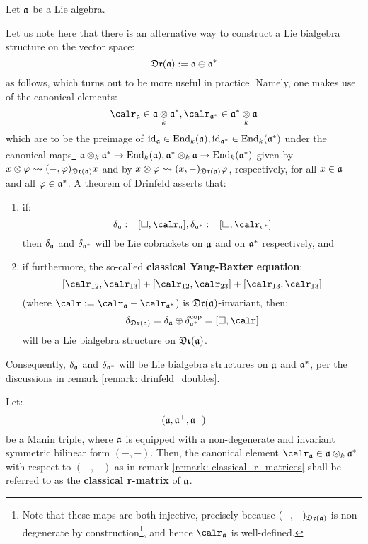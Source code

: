         \begin{remark} \label{remark: classical_r_matrices}
            Let $\a$ be a Lie algebra.
        
            Let us note here that there is an alternative way to construct a Lie bialgebra structure on the vector space:
                $$\mathfrak{Dr}(\mathfrak{a}) := \mathfrak{a} \oplus \mathfrak{a}^*$$
            as follows, which turns out to be more useful in practice. Namely, one makes use of the canonical elements:
                $$\calr_{\a} \in \a \tensor_k \a^*, \calr_{\a^*} \in \a^* \tensor_k \a$$
            which are to be the preimage of $\mathrm{id}_{\mathfrak{a}} \in \mathrm{End}_k(\mathfrak{a}), \mathrm{id}_{\mathfrak{a}^*} \in \mathrm{End}_k(\mathfrak{a}^*)$ under the canonical maps\footnote{Note that these maps are both injective, precisely because $(-, -)_{\mathfrak{Dr}(\mathfrak{a})}$ is non-degenerate by construction\footnote{Note that we are not making use of invariance here, and hence we do not need to assume that $\a$ is a Lie bialgebra from the start (this assumption is needed for the construction of the Lie bracket on $\frakDr(\a)$).}, and hence $\calr_{\a}$ is well-defined.} $\a \tensor_k \a^* \to \End_k(\a), \a^* \tensor_k \a \to \End_k(\a^*)$ given by $x \tensor \varphi \mapsto (-, \varphi)_{\frakDr(\a)} x$ and by $x \tensor \varphi \mapsto (x, -)_{\frakDr(\a)} \varphi$, respectively, for all $x \in \mathfrak{a}$ and all $\varphi \in \mathfrak{a}^*$. A theorem of Drinfeld asserts that:
            \begin{enumerate}
                \item if:
                    $$\delta_{\a} := [\Box, \calr_{\a}], \delta_{\a^*} := [\Box, \calr_{\a^*}]$$
                then $\delta_{\mathfrak{a}}$ and $\delta_{\mathfrak{a}^*}$ will be Lie cobrackets on $\a$ and on $\mathfrak{a}^*$ respectively, and
                \item if furthermore, the so-called \textbf{classical Yang-Baxter equation}:
                    $$[\calr_{12}, \calr_{13}] + [\calr_{12}, \calr_{23}] + [\calr_{13}, \calr_{13}]$$
                (where $\calr := \calr_{\a} - \calr_{\a^*}$) is $\frakDr(\a)$-invariant, then:
                    $$\delta_{\frakDr(\a)} = \delta_{\a} \oplus \delta_{\a^*}^{\cop} = [\Box, \calr]$$
                will be a Lie bialgebra structure on $\frakDr(\a)$.
            \end{enumerate}
            Consequently, $\delta_{\mathfrak{a}}$ and $\delta_{\mathfrak{a}^*}$ will be Lie bialgebra structures on $\a$ and $\mathfrak{a}^*$, per the discussions in remark \ref{remark: drinfeld_doubles}.
        \end{remark}
        \begin{definition} \label{def: classical_r_matrices}
            Let:
                $$(\mathfrak{a}, \mathfrak{a}^+, \mathfrak{a}^-)$$
            be a Manin triple, where $\a$ is equipped with a non-degenerate and invariant symmetric bilinear form $(-, -)$. Then, the canonical element $\calr_{\a} \in \a \tensor_k \a^*$ with respect to $(-, -)$ as in remark \ref{remark: classical_r_matrices} shall be referred to as the \textbf{classical r-matrix} of $\a$.
        \end{definition}
